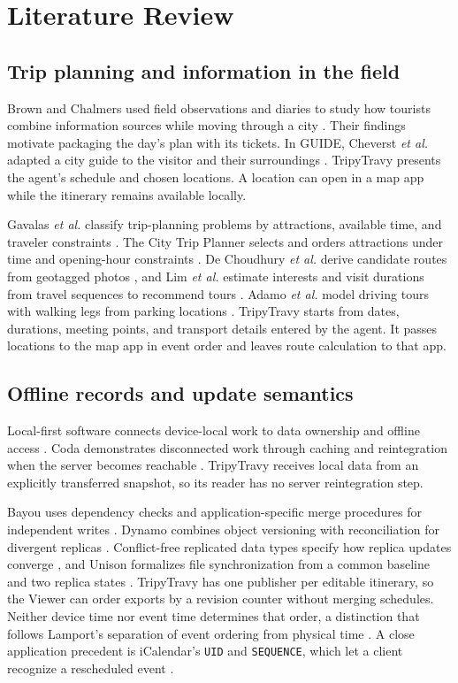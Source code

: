 \section{Literature Review}
\label{sec:literature}

\subsection{Trip planning and information in the field}
Brown and Chalmers used field observations and diaries to study how tourists combine information sources while moving through a city \cite{brown}. Their findings motivate packaging the day's plan with its tickets. In GUIDE, Cheverst \emph{et al.} adapted a city guide to the visitor and their surroundings \cite{guide}. TripyTravy presents the agent's schedule and chosen locations. A location can open in a map app while the itinerary remains available locally.

Gavalas \emph{et al.} classify trip-planning problems by attractions, available time, and traveler constraints \cite{ttdp}. The City Trip Planner selects and orders attractions under time and opening-hour constraints \cite{city}. De Choudhury \emph{et al.} derive candidate routes from geotagged photos \cite{breadcrumbs}, and Lim \emph{et al.} estimate interests and visit durations from travel sequences to recommend tours \cite{perstour}. Adamo \emph{et al.} model driving tours with walking legs from parking locations \cite{multimodal}. TripyTravy starts from dates, durations, meeting points, and transport details entered by the agent. It passes locations to the map app in event order and leaves route calculation to that app.

\subsection{Offline records and update semantics}
Local-first software connects device-local work to data ownership and offline access \cite{localfirst}. Coda demonstrates disconnected work through caching and reintegration when the server becomes reachable \cite{coda}. TripyTravy receives local data from an explicitly transferred snapshot, so its reader has no server reintegration step.

Bayou uses dependency checks and application-specific merge procedures for independent writes \cite{bayou}. Dynamo combines object versioning with reconciliation for divergent replicas \cite{dynamo}. Conflict-free replicated data types specify how replica updates converge \cite{crdt}, and Unison formalizes file synchronization from a common baseline and two replica states \cite{unison}. TripyTravy has one publisher per editable itinerary, so the Viewer can order exports by a revision counter without merging schedules. Neither device time nor event time determines that order, a distinction that follows Lamport's separation of event ordering from physical time \cite{lamport}. A close application precedent is iCalendar's \texttt{UID} and \texttt{SEQUENCE}, which let a client recognize a rescheduled event \cite{itip}.

